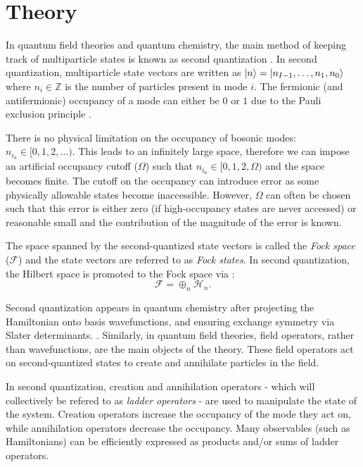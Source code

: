 \section{Theory}

In quantum field theories and quantum chemistry, the main method of keeping track of multiparticle states is known as second quantization \cite{Sakurai_Napolitano_2020}.
In second quantization, multiparticle state vectors are written as $\ket{n} = \ket{n_{I-1}, \dots, n_1, n_0}$ where $n_i \in \mathbb{Z}$ is the number of particles present in mode $i$.
The fermionic (and antifermionic) occupancy of a mode can either be $0$ or $1$ due to the Pauli exclusion principle .

There is no physical limitation on the occupancy of bosonic modes: $n_{i_a} \in [0, 1, 2, \dots)$.
This leads to an infinitely large space, therefore we can impose an artificial occupancy cutoff ($\Omega$) such that $n_{i_a} \in [0, 1, 2, \Omega)$ and the space becomes finite.
The cutoff on the occupancy can introduce error as some physically allowable states become inaccessible.
However, $\Omega$ can often be chosen such that this error is either zero (if high-occupancy states are never accessed) or reasonable small and the contribution of the magnitude of the error is known. 

The space spanned by the second-quantized state vectors is called the \textit{Fock space} ($\mathcal{F}$) and the state vectors are referred to as \textit{Fock states}.
In second quantization, the Hilbert space is promoted to the Fock space via \cite{Schwartz_2013}:
\begin{equation}
    \mathcal{F} = \oplus_n \mathcal{H}_n.
\end{equation}

Second quantization appears in quantum chemistry after projecting the Hamiltonian onto basis wavefunctions, and ensuring exchange symmetry via Slater determinants. .
Similarly, in quantum field theories, field operators, rather than wavefunctions, are the main objects of the theory. These field operators act on second-quantized states to create and annihilate particles in the field. 

In second quantization, creation and annihilation operators - which will collectively be refered to as \emph{ladder operators} - are used to manipulate the state of the system.
Creation operators increase the occupancy of the mode they act on, while annihilation operators decrease the occupancy.
Many observables (such as Hamiltonians) can be efficiently expressed as products and/or sums of ladder operators.  

